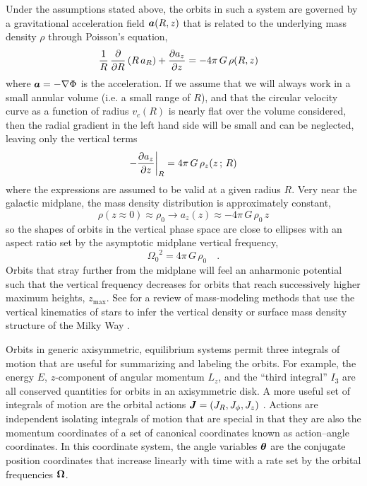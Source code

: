 \documentclass[modern]{aastex631}
\newcommand{\freqzero}{\ensuremath{\Omega_0}}
\begin{document}
Under the assumptions stated above, the orbits in such a system are governed by a
gravitational acceleration field $\boldsymbol{a}(R, z)$ that is related to the underlying mass
density $\rho$ through Poisson's equation,
\begin{align}
    \frac{1}{R} \, \frac{\partial {}}{\partial {R}}\left(R \, a_R\right) + \frac{\partial {a_z}}{\partial {z}}
        &= - 4\pi \, G \, \rho(R, z)
\end{align}
where $\boldsymbol{a} = -\nabla \Phi$ is the acceleration.
If we assume that we will always work in a small annular volume (i.e. a small range of
$R$), and that the circular velocity curve as a function of radius $v_c(R)$ is nearly
flat over the volume considered, then the radial gradient in the left hand side will be
small and can be neglected, leaving only the vertical terms
\begin{equation}
    -\frac{\partial {a_z}}{\partial {z}}\biggr\rvert_R = 4\pi \, G \, \rho_z(z \,;\, R)
\end{equation}
where the expressions are assumed to be valid at a given radius $R$.
Very near the galactic midplane, the mass density distribution is approximately
constant,
\begin{equation}
    \rho(z\approx 0) \approx \rho_0
        \rightarrow a_z(z) \approx -4\pi \, G \, \rho_0 \, z
\end{equation}
so the shapes of orbits in the vertical phase space are close to ellipses with an aspect
ratio set by the asymptotic midplane vertical frequency,
\begin{equation}
    \freqzero^2 = 4\pi\,G \, \rho_0 \quad . \label{eq:freqzero}
\end{equation}
Orbits that stray further from the midplane will feel an anharmonic potential such that
the vertical frequency decreases for orbits that reach successively higher maximum
heights, $z_{\textrm{max}}$.
See \citet{Read:2014} for a review of mass-modeling methods that use the vertical
kinematics of stars to infer the vertical density or surface mass density structure of
the Milky Way \citep[see also, e.g.,][for recent work on the vertical dynamics of the
disk]{Widmark:2019, Buch:2019, Widmark:2021, Li:2021}.

Orbits in generic axisymmetric, equilibrium systems permit three integrals of motion
that are useful for summarizing and labeling the orbits.
For example, the energy $E$, $z$-component of angular momentum $L_z$, and the ``third
integral'' $I_3$ are all conserved quantities for orbits in an axisymmetric disk.
A more useful set of integrals of motion are the orbital actions $\boldsymbol{J} = (J_R,
J_\phi, J_z)$ \citep{Binney:2008}.
Actions are independent isolating integrals of motion that are special in that they are
also the momentum coordinates of a set of canonical coordinates known as action--angle
coordinates.
In this coordinate system, the angle variables $\boldsymbol{\theta}$ are the conjugate position
coordinates that increase linearly with time with a rate set by the orbital frequencies
$\boldsymbol{\Omega}$.
\end{document}
